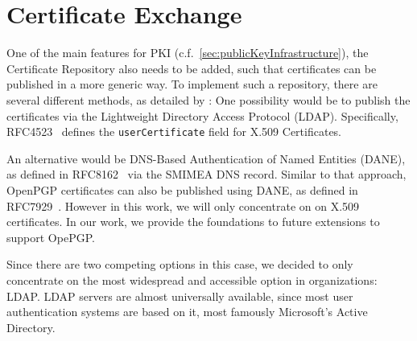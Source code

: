 \section{Certificate Exchange}\label{sec:certificateExchange}
One of the main features for PKI (c.f.~\ref{sec:publicKeyInfrastructure}), the Certificate Repository also needs to be
added, such that certificates can be published in a more generic way.
To implement such a repository, there are several different methods, as detailed by
\citet{hauner2016interoperability}:
One possibility would be to publish the certificates via the Lightweight Directory Access Protocol (LDAP).
Specifically, RFC4523~\cite{RFC4523} defines the \lstinline{userCertificate} field for X.509 Certificates.

An alternative would be DNS-Based Authentication of Named Entities (DANE), as defined in RFC8162~\cite{RFC8162} via the
SMIMEA DNS record.
Similar to that approach, OpenPGP certificates can also be published using DANE, as defined in RFC7929~\cite{RFC7929}.
However in this work, we will only concentrate on on X.509 certificates.
In our work, we provide the foundations to future extensions to support OpePGP\@.

Since there are two competing options in this case, we decided to only concentrate on the most widespread and accessible
option in organizations: LDAP\@.
LDAP servers are almost universally available, since most user authentication systems are based on it, most famously
Microsoft's Active Directory.
